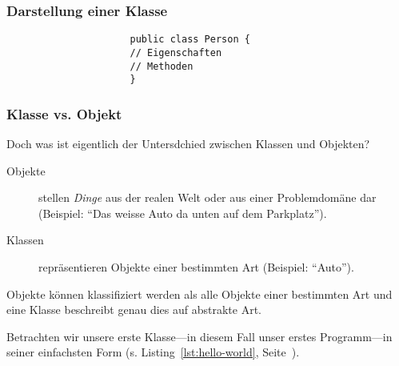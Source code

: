 \begin{frame}[fragile]
    \frametitle<presentation>{Darstellung einer Klasse}

    \begin{figure}[ht]
        \centering
        \begin{minipage}[b]{0.5\textwidth}
            \centering
        \end{minipage}
        \begin{minipage}[b]{0.4\textwidth}
            \begin{verbatim}
                public class Person {
                // Eigenschaften
                // Methoden
                }
            \end{verbatim}
        \end{minipage}
        \label{fig:uml-class}
    \end{figure}

\end{frame}


\begin{frame}[fragile]
    \frametitle<presentation>{Klasse vs. Objekt}

    Doch was ist eigentlich der Untersdchied zwischen Klassen und Objekten?

    \begin{description}
        \item[Objekte] stellen \emph{Dinge} aus der realen Welt oder aus einer Problemdomäne
        dar (Beispiel: ``Das weisse Auto da unten auf dem Parkplatz'').
        \item[Klassen] repräsentieren Objekte einer bestimmten Art (Beispiel: ``Auto'').
    \end{description}

\end{frame}

Objekte können klassifiziert werden als alle Objekte einer bestimmten Art und
eine Klasse beschreibt genau dies auf abstrakte Art.

Betrachten wir unsere erste Klasse---in diesem Fall unser erstes Programm---in
seiner einfachsten Form (s. Listing~\ref{lst:hello-world}, Seite~\pageref{lst:hello-world}).

